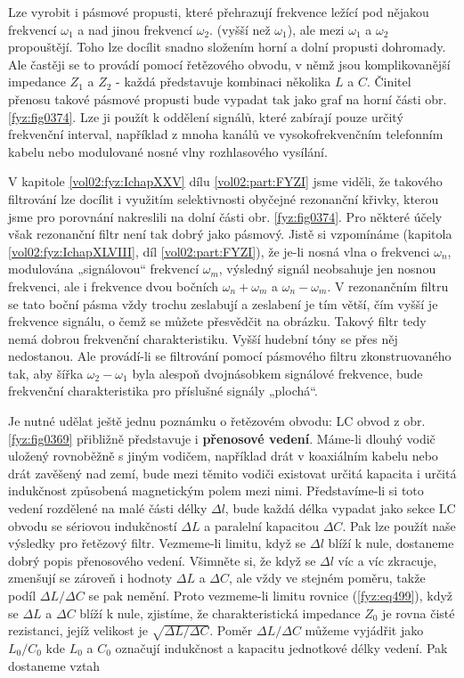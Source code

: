   Lze vyrobit i pásmové propusti, které přehrazují frekvence ležící pod nějakou frekvencí 
  \(\omega_1\) a nad jinou frekvencí \(\omega_2\). (vyšší než \(\omega_1\)), ale mezi \(\omega_1\) 
  a \(\omega_2\) propouštějí. Toho lze docílit snadno složením horní a dolní propusti dohromady. 
  Ale častěji se to provádí pomocí řetězového obvodu, v němž jsou komplikovanější impedance \(Z_1\) 
  a \(Z_2\) - každá představuje kombinaci několika \(L\) a \(C\). Činitel přenosu takové pásmové 
  propusti bude vypadat tak jako graf na horní části obr. \ref{fyz:fig0374}. Lze ji použít k 
  oddělení signálů, které zabírají pouze určitý frekvenční interval, například z mnoha kanálů ve 
  vysokofrekvenčním telefonním kabelu nebo modulované nosné vlny rozhlasového vysílání. 
  
  V kapitole \ref{vol02:fyz:IchapXXV} dílu \ref{vol02:part:FYZI} jsme viděli, že takového filtrování lze 
  docílit i využitím selektivnosti obyčejné rezonanční křivky, kterou jsme pro porovnání nakreslili 
  na dolní části obr. \ref{fyz:fig0374}. Pro některé účely však rezonanční filtr není tak dobrý jako 
  pásmový. Jistě si vzpomínáme (kapitola \ref{vol02:fyz:IchapXLVIII}, díl \ref{vol02:part:FYZI}), že je-li 
  nosná vlna o frekvenci \(\omega_n\), modulována „signálovou“ frekvencí \(\omega_m\), výsledný 
  signál neobsahuje jen nosnou frekvenci, ale i frekvence dvou bočních \(\omega_n+\omega_m\) a 
  \(\omega_n-\omega_m\). V rezonančním filtru se tato boční pásma vždy trochu zeslabují a zeslabení 
  je tím větší, čím vyšší je frekvence signálu, o čemž se můžete přesvědčit na obrázku. Takový 
  filtr tedy nemá dobrou frekvenční charakteristiku. Vyšší hudební tóny se přes něj nedostanou. Ale 
  provádí-li se filtrování pomocí pásmového filtru zkonstruovaného tak, aby šířka 
  \(\omega_2-\omega_1\) byla alespoň dvojnásobkem signálové frekvence, bude frekvenční 
  charakteristika pro příslušné signály „plochá“. 
  
  Je nutné udělat ještě jednu poznámku o řetězovém obvodu: LC obvod z obr. \ref{fyz:fig0369} 
  přibližně představuje i \textbf{přenosové vedení}. Máme-li dlouhý vodič uložený rovnoběžně s 
  jiným vodičem, například drát v koaxiálním kabelu nebo drát zavěšený nad zemí, bude mezi těmito 
  vodiči existovat určitá kapacita i určitá indukčnost způsobená magnetickým polem mezi nimi. 
  Představíme-li si toto vedení rozdělené na malé části délky \(\Delta l\), bude každá délka 
  vypadat jako sekce LC obvodu se sériovou indukčností \(\Delta L\) a paralelní kapacitou \(\Delta 
  C\). Pak lze použít naše výsledky pro řetězový filtr. Vezmeme-li limitu, když se \(\Delta l\) 
  blíží k nule, dostaneme dobrý popis přenosového vedení. Všimněte si, že když se \(\Delta l\) víc 
  a víc zkracuje, zmenšují se zároveň i hodnoty \(\Delta L\) a \(\Delta C\), ale vždy ve stejném 
  poměru, takže podíl \(\Delta L/\Delta C\) se pak nemění. Proto vezmeme-li limitu rovnice 
  (\ref{fyz:eq499}), když se \(\Delta L\) a \(\Delta C\) blíží k nule, zjistíme, že 
  charakteristická impedance \(Z_0\) je rovna čisté rezistanci, jejíž velikost je \(\sqrt{\Delta 
  L/\Delta C}\). Poměr \(\Delta L/\Delta C\) můžeme vyjádřit jako \(L_0/C_0\) kde \(L_0\) a \(C_0\) 
  označují indukčnost a kapacitu jednotkové délky vedení. Pak dostaneme vztah
  

